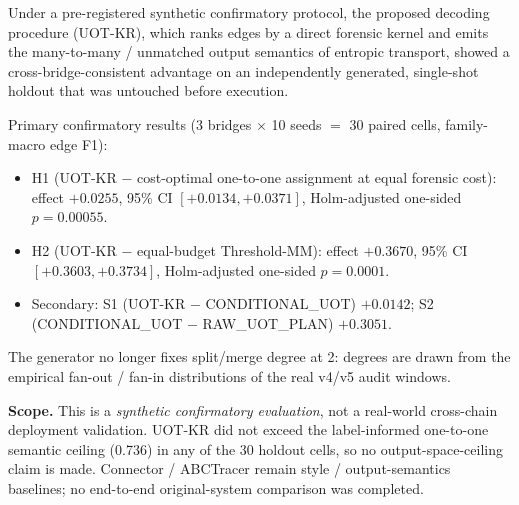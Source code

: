 Under a pre-registered synthetic confirmatory protocol, the proposed decoding procedure
(UOT-KR), which ranks edges by a direct forensic kernel and emits the many-to-many /
unmatched output semantics of entropic transport, showed a cross-bridge-consistent
advantage on an independently generated, single-shot holdout that was untouched before
execution.

Primary confirmatory results (3 bridges $\times$ 10 seeds $=$ 30 paired cells, family-macro
edge F1):

\begin{itemize}
  \item H1 (UOT-KR $-$ cost-optimal one-to-one assignment at equal forensic cost):
        effect $+0.0255$, 95\% CI $[+0.0134, +0.0371]$,
        Holm-adjusted one-sided $p = 0.00055$.
  \item H2 (UOT-KR $-$ equal-budget Threshold-MM):
        effect $+0.3670$, 95\% CI $[+0.3603, +0.3734]$,
        Holm-adjusted one-sided $p = 0.0001$.
  \item Secondary: S1 (UOT-KR $-$ CONDITIONAL\_UOT) $+0.0142$;
        S2 (CONDITIONAL\_UOT $-$ RAW\_UOT\_PLAN) $+0.3051$.
\end{itemize}

The generator no longer fixes split/merge degree at 2: degrees are drawn from the empirical
fan-out / fan-in distributions of the real v4/v5 audit windows.

\textbf{Scope.} This is a \emph{synthetic confirmatory evaluation}, not a real-world
cross-chain deployment validation. UOT-KR did not exceed the label-informed one-to-one
semantic ceiling (0.736) in any of the 30 holdout cells, so no
output-space-ceiling claim is made. Connector / ABCTracer remain style /
output-semantics baselines; no end-to-end original-system comparison was completed.
